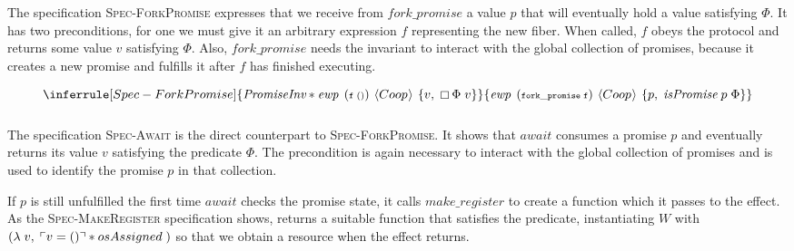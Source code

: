 \subsubsection{}
\label{sec:sched-spec-fork}

The specification \textsc{Spec-ForkPromise} expresses that we receive from \(fork\_promise\) a value \(p\) that will eventually hold a value satisfying \(\Phi\).
It has two preconditions, for one we must give it an arbitrary expression \(f\) representing the new fiber.
When called, \(f\) obeys the \proto{} protocol and returns some value \(v\) satisfying \(\Phi\).
Also, \(fork\_promise\) needs the \gsPInv{} invariant to interact with the global collection of promises, because it creates a new promise and fulfills it after \(f\) has finished executing.

\[
  \inferrule[Spec-ForkPromise]
  {\gsPInv{} \ast \ewp{f\;()}{\proto{}}{v,\; \always \Phi\; v}}
  {\ewp{fork\_promise\; f}{\proto{}}{p,\; \gsIsPr{}\; p\; \Phi}}
\]

\subsubsection{}
\label{sec:sched-spec-await}

The specification \textsc{Spec-Await} is the direct counterpart to \textsc{Spec-ForkPromise}.
It shows that \(await\) consumes a promise \(p\) and eventually returns its value \(v\) satisfying the predicate \(\Phi\).
The precondition \gsPInv{} is again necessary to interact with the global collection of promises and \gsIsPr{} is used to identify the promise \(p\) in that collection.

If \(p\) is still unfulfilled the first time \(await\) checks the promise state, it calls \(make\_register\) to create a  function which it passes to the \esuspend{} effect.
As the \textsc{Spec-MakeRegister} specification shows,  returns a suitable function that satisfies the \gsIsReg{} predicate, instantiating \(W\) with \((\lambda\; v,\; \ulcorner v = () \urcorner \ast osAssigned\;)\) so that we obtain a \gspdone{} resource when the effect returns.


